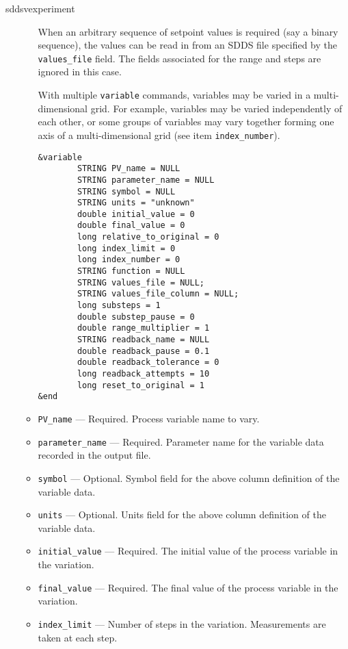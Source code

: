 \begin{sddsprog}{sddsvexperiment}
\begin{itemize}
\begin{itemize}
      When an arbitrary sequence of setpoint values is required (say a
      binary sequence), the values can be read in from an SDDS file
      specified by the {\verb+values_file+} field.  The fields
      associated for the range and steps are ignored in this case.

      With multiple \verb+variable+ commands, variables may be varied
      in a multi-dimensional grid.  For example, variables may be
      varied independently of each other, or some groups of variables
      may vary together forming one axis of a multi-dimensional grid
      (see item {\verb+index_number+}).

\begin{verbatim}
&variable
        STRING PV_name = NULL
        STRING parameter_name = NULL
        STRING symbol = NULL
        STRING units = "unknown"
        double initial_value = 0
        double final_value = 0
        long relative_to_original = 0
        long index_limit = 0
        long index_number = 0
        STRING function = NULL
        STRING values_file = NULL;
        STRING values_file_column = NULL;
        long substeps = 1
        double substep_pause = 0
        double range_multiplier = 1
        STRING readback_name = NULL
        double readback_pause = 0.1
        double readback_tolerance = 0
        long readback_attempts = 10
        long reset_to_original = 1
&end        
\end{verbatim}
   \item {\verb+PV_name+} --- Required. Process variable name to vary.

   \item {\verb+parameter_name+} --- Required. Parameter name for the
   variable data recorded in the output file.

   \item {\verb+symbol+} --- Optional. Symbol field for the above
   column definition of the variable data.

   \item {\verb+units+} --- Optional. Units field for the above column
   definition of the variable data.

   \item {\verb+initial_value+} --- Required. The initial value of the
   process variable in the variation.

   \item {\verb+final_value+} --- Required. The final value of the
   process variable in the variation.

   \item {\verb+index_limit+} --- Number of steps in the
   variation. Measurements are taken at each step.


\end{itemize}
\end{itemize}
\end{sddsprog}
